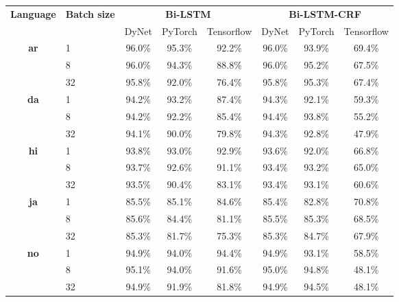 \begin{table}[h]
    \centering
    \begin{tabular}{c l c c c|c c c}
        \toprule
        \multirow{2}{*}{\bfseries Language} &
        \multirow{2}{*}{\bfseries Batch size} &
        \multicolumn{3}{c}{\bfseries Bi-LSTM} &
        \multicolumn{3}{c}{\bfseries Bi-LSTM-CRF} \\
        \cmidrule(lr){3-8}
        && DyNet & PyTorch & Tensorflow & DyNet & PyTorch & Tensorflow \\

        \cmidrule(lr){1-8}
        \multirow{3}{*}{\bfseries ar}
        &  1 & 96.0\% & 95.3\% & 92.2\% & 96.0\% & 93.9\% & 69.4\% \\
        &  8 & 96.0\% & 94.3\% & 88.8\% & 96.0\% & 95.2\% & 67.5\% \\
        & 32 & 95.8\% & 92.0\% & 76.4\% & 95.8\% & 95.3\% & 67.4\% \\

        \cmidrule(lr){1-8}
        \multirow{3}{*}{\bfseries da}
        &  1 & 94.2\% & 93.2\% & 87.4\% & 94.3\% & 92.1\% & 59.3\% \\
        &  8 & 94.2\% & 92.2\% & 85.4\% & 94.4\% & 93.8\% & 55.2\% \\
        & 32 & 94.1\% & 90.0\% & 79.8\% & 94.3\% & 92.8\% & 47.9\% \\

        \cmidrule(lr){1-8}
        \multirow{3}{*}{\bfseries hi}
        &  1 & 93.8\% & 93.0\% & 92.9\% & 93.6\% & 92.0\% & 66.8\% \\
        &  8 & 93.7\% & 92.6\% & 91.1\% & 93.4\% & 93.2\% & 65.0\% \\
        & 32 & 93.5\% & 90.4\% & 83.1\% & 93.4\% & 93.1\% & 60.6\% \\

        \cmidrule(lr){1-8}
        \multirow{3}{*}{\bfseries ja}
        &  1 & 85.5\% & 85.1\% & 84.6\% & 85.4\% & 82.8\% & 70.8\% \\
        &  8 & 85.6\% & 84.4\% & 81.1\% & 85.5\% & 85.3\% & 68.5\% \\
        & 32 & 85.3\% & 81.7\% & 75.3\% & 85.3\% & 84.7\% & 67.9\% \\

        \cmidrule(lr){1-8}
        \multirow{3}{*}{\bfseries no}
        &  1 & 94.9\% & 94.0\% & 94.4\% & 94.9\% & 93.1\% & 58.5\% \\
        &  8 & 95.1\% & 94.0\% & 91.6\% & 95.0\% & 94.8\% & 48.1\% \\
        & 32 & 94.9\% & 91.9\% & 81.8\% & 94.9\% & 94.5\% & 48.1\% \\


\end{tabular}
\end{table}
